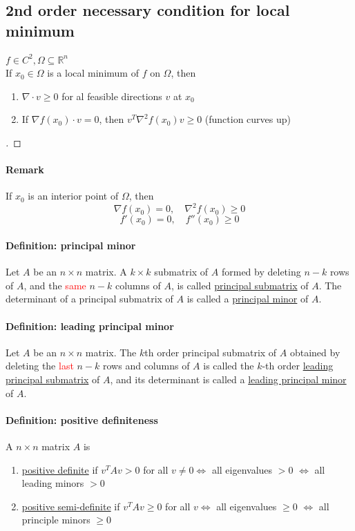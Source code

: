 \documentclass[11pt]{article}
\newcommand{\real}[0]{\mathbb{R}}
\newcommand{\under}[1]{\underline{#1}}
\begin{document}
\subsection{2nd order necessary condition for local minimum}
$f \in C^2, \Omega \subseteq \real^n$ \\
If $x_0 \in \Omega$ is a local minimum of $f$ on $\Omega$, then
\begin{enumerate}
	\item $\nabla \cdot v \geq 0$ for al feasible directions $v$ at $x_0$
	\item If $\nabla f(x_0) \cdot v = 0$, then $v^T \nabla^2 f(x_0) v \geq 0$
	(function curves up)
\end{enumerate}
\begin{proof}
[ ]
\end{proof}

\paragraph{Remark}
If $x_0$ is an interior point of $\Omega$, then
$$\nabla f(x_0) = 0, \quad \nabla^2 f(x_0)\geq 0$$
$$f'(x_0) = 0, \quad f''(x_0) \geq 0$$

\paragraph{Definition: principal minor}
Let $A$ be an $n \times n$ matrix. A $k \times k$ submatrix of $A$ formed by deleting $n-k$ rows of $A$, and the \textcolor{red}{same} $n - k$ columns of $A$, is called \under{principal submatrix} of $A$. The determinant of a principal submatrix of $A$ is called a \under{principal minor} of $A$.

\paragraph{Definition: leading principal minor}
Let $A$ be an $n \times n$ matrix. The $k$th order principal submatrix of $A$ obtained by deleting the \textcolor{red}{last} $n-k$ rows and columns of $A$ is called the $k$-th order \under{leading principal submatrix} of $A$, and its determinant is called a \under{leading principal minor} of $A$.

\paragraph{Definition: positive definiteness}
A $n \times n$ matrix $A$ is \\
\begin{enumerate}
	\item \under{positive definite} if $v^TAv > 0$ for all $v \neq 0 \iff $ all eigenvalues $>0$ $\iff$ all leading minors $> 0$
	\item \under{positive semi-definite} if $v^TAv \geq 0$ for all $v \iff $ all eigenvalues $\geq 0$ $\iff$ all principle minors $\geq 0$
\end{enumerate}
\end{document}
